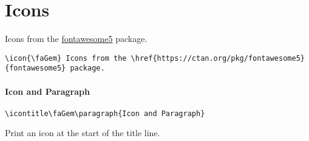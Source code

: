\documentclass[itdr]{subfiles}
\begin{document}
\vfill
\break

\section{Icons}

\icon{\faGem} Icons from the \href{https://ctan.org/pkg/fontawesome5}{fontawesome5} package.

\begin{lstlisting}
\icon{\faGem} Icons from the \href{https://ctan.org/pkg/fontawesome5}{fontawesome5} package.
\end{lstlisting}

\skipline

\icontitle\faGem\paragraph{Icon and Paragraph}

\begin{lstlisting}
\icontitle\faGem\paragraph{Icon and Paragraph}
\end{lstlisting}

Print an icon at the start of the title line.

\skipline
\end{document}
